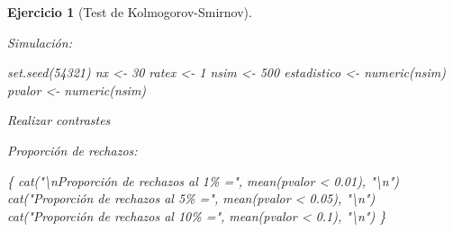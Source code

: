 \documentclass[
]{book}
\newenvironment{Shaded}{\begin{snugshade}}{\end{snugshade}}
\newcommand{\AttributeTok}[1]{\textcolor[rgb]{0.77,0.63,0.00}{#1}}
\newcommand{\CommentTok}[1]{\textcolor[rgb]{0.56,0.35,0.01}{\textit{#1}}}
\newcommand{\ControlFlowTok}[1]{\textcolor[rgb]{0.13,0.29,0.53}{\textbf{#1}}}
\newcommand{\DecValTok}[1]{\textcolor[rgb]{0.00,0.00,0.81}{#1}}
\newcommand{\FloatTok}[1]{\textcolor[rgb]{0.00,0.00,0.81}{#1}}
\newcommand{\FunctionTok}[1]{\textcolor[rgb]{0.00,0.00,0.00}{#1}}
\newcommand{\NormalTok}[1]{#1}
\newcommand{\OtherTok}[1]{\textcolor[rgb]{0.56,0.35,0.01}{#1}}
\newcommand{\SpecialCharTok}[1]{\textcolor[rgb]{0.00,0.00,0.00}{#1}}
\newcommand{\StringTok}[1]{\textcolor[rgb]{0.31,0.60,0.02}{#1}}
\theoremstyle{break}
\newtheorem{exercise}{Ejercicio}[chapter]
\theoremstyle{nonumberplain}
\renewcommand{\CommentTok}[1]{\textcolor[rgb]{0.41,0.41,0.41}{\texttt{#1}}}
\begin{document}
\begin{exercise}[Test de Kolmogorov-Smirnov]
\begin{enumerate}
  Simulación:

\begin{Shaded}
\begin{Highlighting}[]
\FunctionTok{set.seed}\NormalTok{(}\DecValTok{54321}\NormalTok{)}
\NormalTok{nx }\OtherTok{\textless{}{-}} \DecValTok{30}
\NormalTok{ratex }\OtherTok{\textless{}{-}} \DecValTok{1}
\NormalTok{nsim }\OtherTok{\textless{}{-}} \DecValTok{500}
\NormalTok{estadistico }\OtherTok{\textless{}{-}} \FunctionTok{numeric}\NormalTok{(nsim)}
\NormalTok{pvalor }\OtherTok{\textless{}{-}} \FunctionTok{numeric}\NormalTok{(nsim)}
\end{Highlighting}
\end{Shaded}

  Realizar contrastes

\begin{Shaded}
\end{Shaded}

  Proporción de rechazos:

\begin{Shaded}
\begin{Highlighting}[]
\NormalTok{\{}
  \FunctionTok{cat}\NormalTok{(}\StringTok{"}\SpecialCharTok{\textbackslash{}n}\StringTok{Proporción de rechazos al 1\% ="}\NormalTok{, }\FunctionTok{mean}\NormalTok{(pvalor }\SpecialCharTok{\textless{}} \FloatTok{0.01}\NormalTok{), }\StringTok{"}\SpecialCharTok{\textbackslash{}n}\StringTok{"}\NormalTok{)}
  \FunctionTok{cat}\NormalTok{(}\StringTok{"Proporción de rechazos al 5\% ="}\NormalTok{, }\FunctionTok{mean}\NormalTok{(pvalor }\SpecialCharTok{\textless{}} \FloatTok{0.05}\NormalTok{), }\StringTok{"}\SpecialCharTok{\textbackslash{}n}\StringTok{"}\NormalTok{)}
  \FunctionTok{cat}\NormalTok{(}\StringTok{"Proporción de rechazos al 10\% ="}\NormalTok{, }\FunctionTok{mean}\NormalTok{(pvalor }\SpecialCharTok{\textless{}} \FloatTok{0.1}\NormalTok{), }\StringTok{"}\SpecialCharTok{\textbackslash{}n}\StringTok{"}\NormalTok{)}
\NormalTok{\}}
\end{Highlighting}
\end{Shaded}


\end{enumerate}
\end{exercise}
\end{document}

